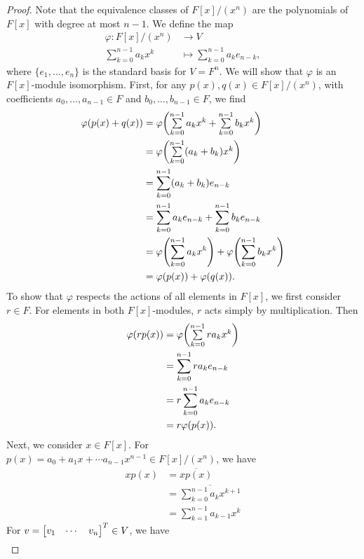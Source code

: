 \documentclass[12pt]{article}
\theoremstyle{definition}
\renewcommand{\phi}{\varphi}
\newcommand{\eqc}{\overline}
\newcommand{\tsum}{\textstyle\sum\limits}
\begin{document}
\begin{proof}
    Note that the equivalence classes of $F[x]/(x^n)$ are the polynomials of $F[x]$ with degree at most $n-1$. We define the map
    \begin{align*}
        \phi : F[x]/(x^n) &\to V \\
            \tsum_{k=0}^{n-1} a_k x^k &\mapsto \tsum_{k=0}^{n-1} a_k e_{n-k},
    \end{align*}
    where $\{e_1, \dots, e_n\}$ is the standard basis for $V = F^n$. We will show that $\phi$ is an $F[x]$-module isomorphism. First, for any $p(x), q(x) \in F[x]/(x^n)$, with coefficients $a_0, \dots, a_{n-1} \in F$ and $b_0, \dots, b_{n-1} \in F$, we find
    \begin{align*}
        \phi\qty(p(x) + q(x))
            &= \phi\qty(\tsum_{k=0}^{n-1} a_k x^k + \tsum_{k=0}^{n-1} b_k x^k) \\
            &= \phi\qty(\tsum_{k=0}^{n-1} (a_k + b_k) x^k) \\
            &= \sum_{k=0}^{n-1} (a_k + b_k) e_{n-k} \\
            &= \sum_{k=0}^{n-1} a_k e_{n-k} + \sum_{k=0}^{n-1} b_k e_{n-k} \\
            &= \phi\qty(\sum_{k=0}^{n-1} a_k x^k) + \phi\qty(\sum_{k=0}^{n-1} b_k x^k) \\
            &= \phi(p(x)) + \phi(q(x)).
    \end{align*}
    To show that $\phi$ respects the actions of all elements in $F[x]$, we first consider $r \in F$. For elements in both $F[x]$-modules, $r$ acts simply by multiplication. Then
    \begin{align*}
        \phi(rp(x))
            &= \phi\qty(\tsum_{k=0}^{n-1} ra_k x^k) \\
            &= \sum_{k=0}^{n-1} ra_k e_{n-k} \\
            &= r\sum_{k=0}^{n-1} a_k e_{n-k} \\
            &= r \phi(p(x)). 
    \end{align*}
    Next, we consider $x \in F[x]$. For $p(x) = a_0 + a_1 x + \cdots a_{n-1}x^{n-1} \in F[x]/(x^n)$, we have
    \begin{align*}
        xp(x)
            &= \eqc{xp(x)} \\
            &= \eqc{\tsum_{k=0}^{n-1} a_k x^{k+1}} \\
            &= \sum_{k=1}^{n-1} a_{k-1} x^k
    \end{align*}
    For $v = \mqty[v_1 & \cdots & v_n]^T \in V$, we have
    \begin{align*}

\end{align*}
\end{proof}
\end{document}
